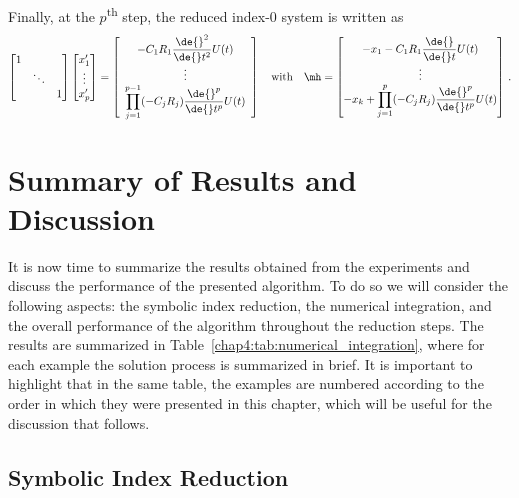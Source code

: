 %
Finally, at the $p$\textsuperscript{th} step, the reduced index-0 system is written as
%
\begin{equation*}
  \begin{bmatrix}
    1 & & \\
    & \ddots & \\
    & & 1 \\
  \end{bmatrix}
  \begin{bmatrix}
    x_1^{\prime} \\ \vdots \\ x_p^{\prime}
  \end{bmatrix} = \left[\begin{array}{c}
    -C_1R_1 \dfrac{\de{}^{2}}{\de{}t^{2}}U(t) \\
    \vdots \\
    \displaystyle\prod_{j=1}^{p-1} (-C_j R_j) \dfrac{\de{}^{p}}{\de{}t^{p}}U(t)
  \end{array}\right]
  \quad \text{with} \quad
  \mh = \begin{bmatrix}
    -x_{1} - C_1R_1 \dfrac{\de{}}{\de{}t}U(t) \\
    \vdots \\
    -x_k + \displaystyle\prod_{j=1}^{p} (-C_j R_j) \dfrac{\de{}^{p}}{\de{}t^{p}}U(t)
  \end{bmatrix} \, \text{.}
\end{equation*}
%


\section{Summary of Results and Discussion}

It is now time to summarize the results obtained from the experiments and discuss the performance of the presented algorithm. To do so we will consider the following aspects: the symbolic index reduction, the numerical integration, and the overall performance of the algorithm throughout the reduction steps. The results are summarized in Table~\ref{chap4:tab:numerical_integration}, where for each example the solution process is summarized in brief. It is important to highlight that in the same table, the examples are numbered according to the order in which they were presented in this chapter, which will be useful for the discussion that follows.

\subsection{Symbolic Index Reduction}

